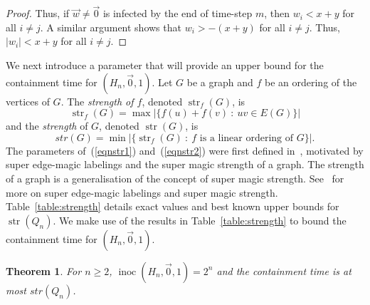 \documentclass[unknownkeysallowed]{article}
\newtheorem{theorem}{Theorem}[section]
\theoremstyle{definition}\newtheorem{strategy}{Strategy}
\theoremstyle{definition}\newtheorem{notation}{Notation}[theorem]
\DeclareMathOperator{\strength}{str}
\DeclareMathOperator{\inoc}{inoc}
\begin{document}
\begin{proof}
Thus, if $\vec{w} \neq \vec{0}$ is infected by the end of time-step $m$, then $w_i < x+y$ for all $i \neq j$.  A similar argument shows that $w_i > -(x+y)$ for all $i \neq j$.  Thus, $|w_i| < x+y$ for all $i \neq j$.
\end{proof}




We next introduce a parameter that will provide an upper bound for the containment time for $(H_n,\vec{0},1)$. Let $G$ be a graph and $f$ be an ordering of the vertices of $G$. The {\it strength of $f$}, denoted $\strength_f(G)$, is \begin{equation}\label{eqnstr1} \strength_f(G) = \max \big|\{ f(u)+f(v) ~:~ uv \in E(G)\}\big|\end{equation} and the {\it strength} of $G$, denoted $\strength(G)$, is \begin{equation}\label{eqnstr2}str(G) = \min \big|\{ \strength_f(G)~:~ f \text{~is a linear ordering of~} G\}\big|.\end{equation}  The parameters of~(\ref{eqnstr1}) and~(\ref{eqnstr2}) were first defined in~\cite{I.2018}, motivated by super edge-magic labelings and the super magic strength of a graph.  The strength of a graph is a generalisation of the concept of super magic strength.  See~\cite{Av,I.2018} for more on super edge-magic labelings and super magic strength.  Table~\ref{table:strength} details exact values and best known upper bounds for $\strength(Q_n)$. 
We make use of the results in Table~\ref{table:strength} to bound the containment time for $(H_n,\vec{0},1)$.

 \begin{theorem}\label{thm:upperstrongQn} For $n \geq 2$,  $\inoc(H_n,\vec{0},1)=2^n$ and the containment time is at most $str(Q_n)$.
\end{theorem}
\end{document}
